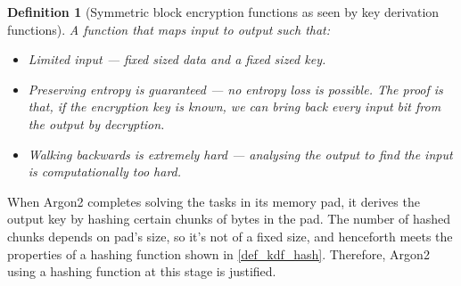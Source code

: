 \documentclass[twocolumn]{article}
\newtheorem{definition}{Definition}[section]
\begin{document}
\begin{definition}[Symmetric block encryption functions as seen by key
derivation functions]\label{def_kdf_enc}
    A function that maps input to output such that:
    \begin{itemize}
        \item Limited input --- fixed sized data and a fixed sized
        key.

        \item Preserving entropy is guaranteed --- no entropy loss is
        possible.  The proof is that, if the encryption key is known, we
        can bring back every input bit from the output by decryption.

        \item Walking backwards is extremely hard --- analysing the output
        to find the input is computationally too hard.
    \end{itemize}
\end{definition}

When Argon2 completes solving the tasks in its memory pad, it
derives the output key by hashing certain chunks of bytes in the pad.  The
number of hashed chunks depends on pad's size, so it's not of a fixed size,
and henceforth meets the properties of a hashing function shown in
\cref{def_kdf_hash}.  Therefore, Argon2 using a hashing function at
this stage is justified.
\end{document}
